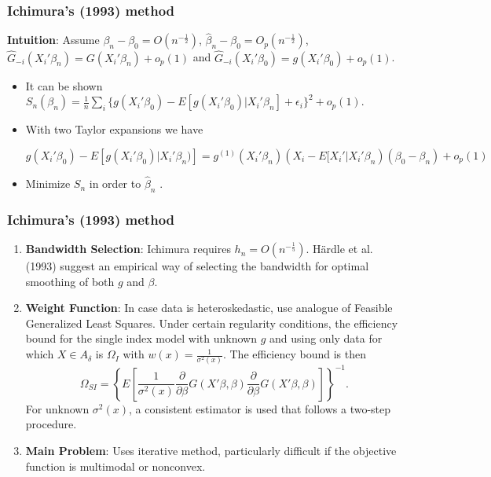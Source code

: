 \documentclass[11pt]{beamer}
\begin{document}
\begin{frame}[t]
    \frametitle{Ichimura's (1993) method}

\textbf{Intuition}: Assume $\beta_n - \beta_0 = O(n^{-\frac{1}{2}})$, $\hat{\beta}_n - \beta_0 = O_p(n^{-\frac{1}{2}})$, $ \hat{G}_{-i}(X_i'\beta_n) = G(X_i'\beta_n) + o_p(1)$ and $\hat{G}_{-i}(X_i'\beta_0) = g(X_i'\beta_0) + o_p(1)$. 
	\begin{itemize}
	\setlength\itemsep{1.5em}

		\item It can be shown $ S_{n}(\beta_n) = \frac{1}{n}\sum_i \{ g(X_i'\beta_0) - E[g(X_i'\beta_0)|X_i'\beta_n] +  \epsilon_i\}^2 + o_p(1)$.	
	
		\item With two Taylor expansions we have


$g(X_i'\beta_0) - E[g(X_i'\beta_0)|X_i'\beta_n)] 
 = g^{(1)}(X_i'\beta_n)( X_i - E[X_i'|X_i'\beta_n)(\beta_0 - \beta_n) + o_p(1)$

		\item Minimize $S_n$ in order to $\hat{\beta}_n$ .
		
\end{itemize}

\end{frame}

\begin{frame}[t]
    \frametitle{Ichimura's (1993) method}
  
	\begin{enumerate}

		\item \textbf{Bandwidth Selection}:
Ichimura requires $h_n=O(n^{-\frac{1}{5}})$. H{\"a}rdle et al. (1993) suggest an empirical way of selecting the bandwidth for optimal smoothing of both $g$ and $\beta$.
		\item \textbf{Weight Function}:
	In case data is heteroskedastic, use analogue of Feasible Generalized Least Squares. Under certain regularity conditions, the efficiency bound for the single index model with unknown $g$ and using only data for which $X \in A_{\delta}$ is $\Omega_I$ with $w(x) = \frac{1}{\sigma^2(x)}$. The efficiency bound is then
		\begin{equation}
\Omega_{SI} = \left\{ E\left[\frac{1}{\sigma^2(x)}\frac{\partial}{\partial \beta}
 G(X'\beta,\beta)\frac{\partial}{\partial \beta} G(X'\beta,\beta) \right] \right\}^{-1}.
		\end{equation}
For unknown $\sigma^2(x)$, a consistent estimator is used that follows a two-step procedure.
		\item \textbf{Main Problem}: Uses iterative method, particularly difficult if the objective function is multimodal or nonconvex.

	\end{enumerate}

\end{frame}
\end{document}
